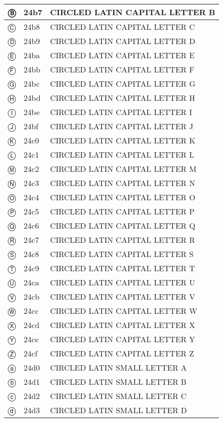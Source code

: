 \documentclass[12pt,letterpaper,openany]{book}
\begin{document}
\begin{center}
\begin{supertabular}{|m{0.25in}|m{0.5in}|m{4in}|}
Ⓑ & 24b7 & CIRCLED LATIN CAPITAL LETTER B\\\hline
Ⓒ & 24b8 & CIRCLED LATIN CAPITAL LETTER C\\\hline
Ⓓ & 24b9 & CIRCLED LATIN CAPITAL LETTER D\\\hline
Ⓔ & 24ba & CIRCLED LATIN CAPITAL LETTER E\\\hline
Ⓕ & 24bb & CIRCLED LATIN CAPITAL LETTER F\\\hline
Ⓖ & 24bc & CIRCLED LATIN CAPITAL LETTER G\\\hline
Ⓗ & 24bd & CIRCLED LATIN CAPITAL LETTER H\\\hline
Ⓘ & 24be & CIRCLED LATIN CAPITAL LETTER I\\\hline
Ⓙ & 24bf & CIRCLED LATIN CAPITAL LETTER J\\\hline
Ⓚ & 24c0 & CIRCLED LATIN CAPITAL LETTER K\\\hline
Ⓛ & 24c1 & CIRCLED LATIN CAPITAL LETTER L\\\hline
Ⓜ & 24c2 & CIRCLED LATIN CAPITAL LETTER M\\\hline
Ⓝ & 24c3 & CIRCLED LATIN CAPITAL LETTER N\\\hline
Ⓞ & 24c4 & CIRCLED LATIN CAPITAL LETTER O\\\hline
Ⓟ & 24c5 & CIRCLED LATIN CAPITAL LETTER P\\\hline
Ⓠ & 24c6 & CIRCLED LATIN CAPITAL LETTER Q\\\hline
Ⓡ & 24c7 & CIRCLED LATIN CAPITAL LETTER R\\\hline
Ⓢ & 24c8 & CIRCLED LATIN CAPITAL LETTER S\\\hline
Ⓣ & 24c9 & CIRCLED LATIN CAPITAL LETTER T\\\hline
Ⓤ & 24ca & CIRCLED LATIN CAPITAL LETTER U\\\hline
Ⓥ & 24cb & CIRCLED LATIN CAPITAL LETTER V\\\hline
Ⓦ & 24cc & CIRCLED LATIN CAPITAL LETTER W\\\hline
Ⓧ & 24cd & CIRCLED LATIN CAPITAL LETTER X\\\hline
Ⓨ & 24ce & CIRCLED LATIN CAPITAL LETTER Y\\\hline
Ⓩ & 24cf & CIRCLED LATIN CAPITAL LETTER Z\\\hline
ⓐ & 24d0 & CIRCLED LATIN SMALL LETTER A\\\hline
ⓑ & 24d1 & CIRCLED LATIN SMALL LETTER B\\\hline
ⓒ & 24d2 & CIRCLED LATIN SMALL LETTER C\\\hline
ⓓ & 24d3 & CIRCLED LATIN SMALL LETTER D\\\hline

\end{supertabular}
\end{center}
\end{document}
